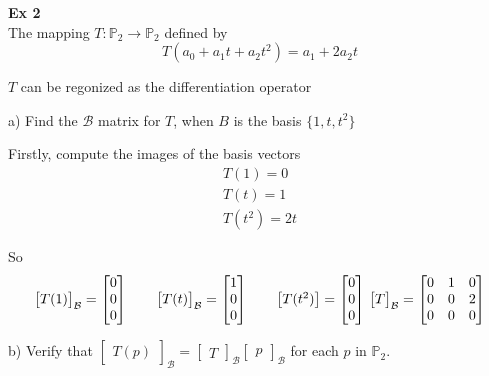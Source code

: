 \documentclass{article}
\begin{document}
  \textbf{Ex 2}\\
  The mapping $ T:\mathbb{P}_2 \to \mathbb{P}_2 $ defined by
  \[
    T(a_0+a_1t+a_2t^{2})=a_1+2a_2t
  \]

  $ T $ can be regonized as the differentiation operator

  a) Find the $ \mathcal{B} $ matrix for $ T $, when $ B $ is the basis $ \{ 1,t,t^{2} \} $ 

  Firstly, compute the images of the basis vectors
  \[
    \begin{gathered}
    T(1)=0\\
    T(t)=1\\
    T(t^{2})=2t
    \end{gathered}
  \]

  So 
  \[
    \begin{bmatrix}
      T(1)
    \end{bmatrix}_\mathcal{B}=
    \begin{bmatrix}
      0\\
      0\\
      0
    \end{bmatrix} \qquad
    \begin{bmatrix}
      T(t)
    \end{bmatrix}_\mathcal{B}=\begin{bmatrix}
      1\\
      0\\
      0
    \end{bmatrix} \qquad
    \begin{bmatrix}
      T(t^{2})
    \end{bmatrix}=
    \begin{bmatrix}
      0\\
      0\\
      0
    \end{bmatrix}\\
    ~\\
    \begin{bmatrix}
      T
    \end{bmatrix}_\mathcal{B}=
    \begin{bmatrix}
      0 &1 &0\\
      0 &0 &2\\
      0 &0 &0
    \end{bmatrix}
  \]

  b) Verify that $\begin{bmatrix}
    T(p)
  \end{bmatrix}_\mathcal{B} =\begin{bmatrix}
    T
  \end{bmatrix}_\mathcal{B}\begin{bmatrix}
    p
  \end{bmatrix}_\mathcal{B} $ for each $ p $ in $ \mathbb{P}_2$.
\end{document}
